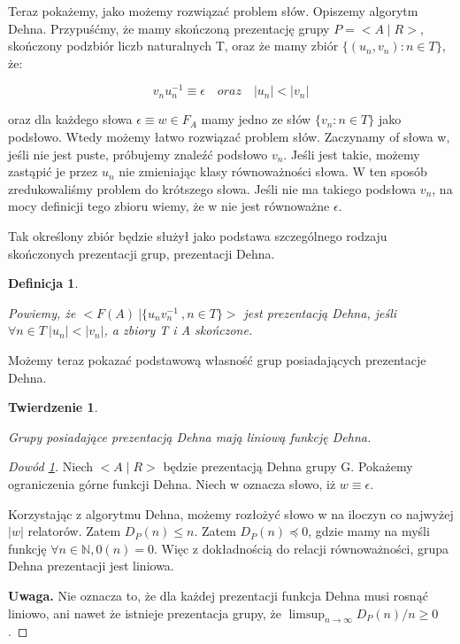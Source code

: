 \documentclass[licencjacka]{pracamgr}
\newtheorem{defi}{Definicja}[section]
\newtheorem{ther}{Twierdzenie}[section]
\begin{document}
Teraz pokażemy, jako możemy rozwiązać problem słów. Opiszemy algorytm Dehna. Przypuśćmy, że mamy skończoną prezentację grupy $P = < A \mid R>$, skończony podzbiór liczb naturalnych T, oraz że mamy zbiór $\{ (u_{n}, v_{n}) : n \in T \}$, że:

\[ v_{n}u_{n}^{-1} \equiv \epsilon \quad oraz \quad | u_{n} | < | v_{n} | \]

\noindent
oraz dla każdego słowa $\epsilon \equiv w \in F_{A}$ mamy jedno ze słów $\{ v_{n} : n \in T \}$ jako podsłowo. Wtedy możemy łatwo rozwiązać problem słów. Zaczynamy of słowa w, jeśli nie jest puste, próbujemy znaleźć podsłowo $v_{n}$. Jeśli jest takie, możemy zastąpić je przez $u_{n}$ nie zmieniając klasy równoważności słowa. W ten sposób zredukowaliśmy problem do krótszego słowa. Jeśli nie ma takiego podsłowa $v_{n}$, na mocy definicji tego zbioru wiemy, że w nie jest równoważne $\epsilon$.

Tak określony zbiór będzie służył jako podstawa szczególnego rodzaju skończonych prezentacji grup, prezentacji Dehna.

\begin{defi}\label{Dehn presentation}

Powiemy, że $ < F(A) \ | \{ u_{n}v_{n}^{-1} \ , n \in T \} >$ jest prezentacją Dehna, jeśli $\forall n \in T \ |u_{n}| < |v_{n}|$, a zbiory T i A skończone.

\end{defi}


Możemy teraz pokazać podstawową własność grup posiadających prezentacje Dehna.

\begin{ther}\label{thm:dehn_pres_linear}

Grupy posiadające prezentacją Dehna mają liniową funkcję Dehna.

\end{ther}

\begin{proof}[Dowód \ref{thm:dehn_pres_linear}]

Niech $<A \mid R> $ będzie prezentacją Dehna grupy G. Pokażemy ograniczenia górne funkcji Dehna. Niech w oznacza słowo, iż $w \equiv \epsilon$.

Korzystając z algorytmu Dehna, możemy rozłożyć słowo w na iloczyn co najwyżej $|w|$ relatorów. Zatem $D_{P}(n) \leq n$.
Zatem $D_P(n) \preceq 0$, gdzie mamy na myśli funkcję $\forall n \in \mathbb{N}, 0(n) = 0$. Więc z dokładnością do relacji równoważności, grupa Dehna prezentacji jest liniowa.

\textbf{Uwaga.} Nie oznacza to, że dla każdej prezentacji funkcja Dehna musi rosnąć liniowo, ani nawet że istnieje prezentacja grupy, że $\limsup_{n \rightarrow \infty} D_{P}(n) / n \geq 0$.

\end{proof}
\end{document}
